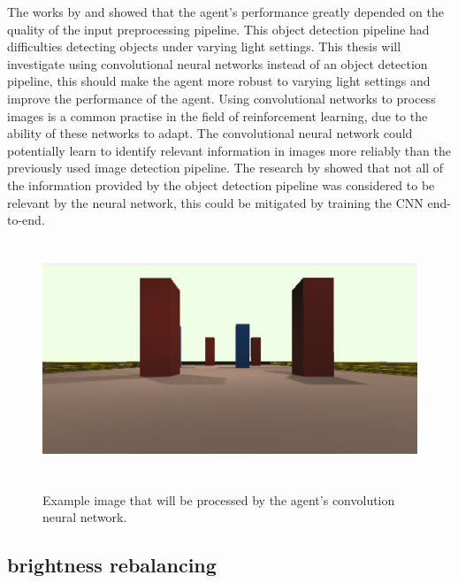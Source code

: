The works by \autocite{merlin_flach} and \autocite{maximilian} showed that the agent's performance greatly depended on the quality of the input preprocessing pipeline. This object detection pipeline had difficulties detecting objects under varying light settings. This thesis will investigate using convolutional neural networks instead of an object detection pipeline, this should make the agent more robust to varying light settings and improve the performance of the agent.
Using convolutional networks to process images is a common practise in the field of reinforcement learning, due to the ability of these networks to adapt. The convolutional neural network could potentially learn to identify relevant information in images more reliably than the previously used image detection pipeline. The research by \autocite{merlin_flach} showed that not all of the information provided by the object detection pipeline was considered to be relevant by the neural network, this could be mitigated by training the CNN end-to-end.


\begin{figure}[h!]
     \centering
     \includegraphics[height=7cm]{Bilder/agent_input_image.png}\\[2.5ex]
     \caption{Example image that will be processed by the agent's convolution neural network.}
     \label{input_image}
\end{figure}

\subsection{brightness rebalancing}

